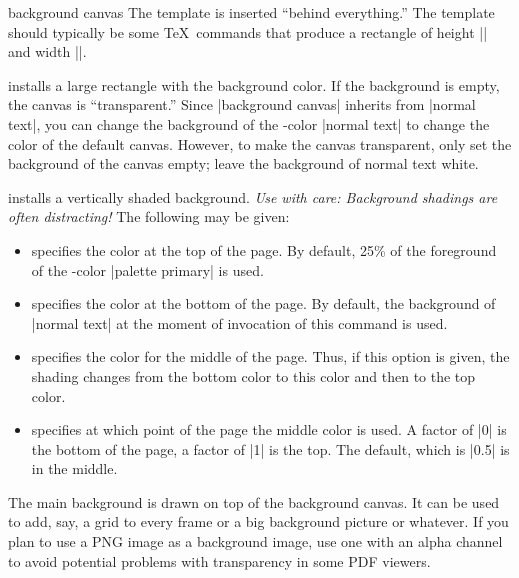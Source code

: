 \begin{element}{background canvas}\yes\yes\yes
  The template is inserted ``behind everything.'' The template should typically be some \TeX\ commands that produce a rectangle of height |\paperheight| and width |\paperwidth|.

  \begin{templateoptions}
    installs a large rectangle with the background color. If the background is empty, the canvas is ``transparent.'' Since |background canvas| inherits from |normal text|, you can change the background of the \beamer-color |normal text| to change the color of the default canvas. However, to make the canvas transparent, only set the background of the canvas empty; leave the background of normal text white.

    installs a vertically shaded background. \emph{Use with care: Background shadings are often distracting!} The following  may be given:
    \begin{itemize}
      \item
       specifies the color at the top of the page. By default, 25\% of the foreground of the \beamer-color |palette primary| is used.
      \item
       specifies the color at the bottom of the page. By default, the background of |normal text| at the moment of invocation of this command is used.
      \item
       specifies the color for the middle of the page. Thus, if this option is given, the shading changes from the bottom color to this color and then to the top color.
      \item
       specifies at which point of the page the middle color is used. A factor of |0| is the bottom of the page, a factor of |1| is the top. The default, which is |0.5| is in the middle.
    \end{itemize}
  \end{templateoptions}
\end{element}

The main background is drawn on top of the background canvas. It can be used to add, say, a grid to every frame or a big background picture or whatever. If you plan to use a PNG image as a background image, use one with an alpha channel to avoid potential problems with transparency in some PDF viewers.

